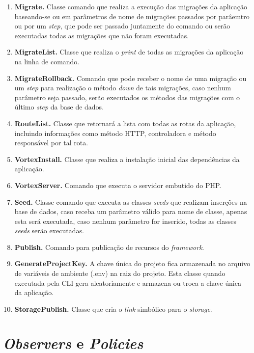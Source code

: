  \begin{enumerate}
     \item \textbf{Migrate.} Classe comando que realiza a execução das migrações da aplicação baseando-se ou em parâmetros de nome de migrações passados por parâemtro ou por um \textit{step}, que pode ser passado juntamente do comando ou serão executadas todas as migrações que não foram executadas.
     \item \textbf{MigrateList.} Classe que realiza o \textit{print} de todas as migrações da aplicação na linha de comando.
     \item \textbf{MigrateRollback.} Comando que pode receber o nome de uma migração ou um \textit{step} para realização o método \textit{down} de tais migrações, caso nenhum parâmetro seja passado, serão executados os métodos das migrações com o último \textit{step} da base de dados.
     \item \textbf{RouteList.} Classe que retornará a lista com todas as rotas da aplicação, incluindo informações como método HTTP, controladora e método responsável por tal rota.
     \item \textbf{VortexInstall.} Classe que realiza a instalação inicial das dependências da aplicação.
     \item \textbf{VortexServer.} Comando que executa o servidor embutido do PHP.
     \item \textbf{Seed.} Classe comando que executa as classes \textit{seeds} que realizam inserções na base de dados, caso receba um parâmetro válido para nome de classe, apenas esta será executada, caso nenhum parâmetro for inserido, todas as classes \textit{seeds} serão executadas.
     \item \textbf{Publish.} Comando para publicação de recursos do \textit{framework}.
     \item \textbf{GenerateProjectKey.} A chave única do projeto fica armazenada no arquivo de variáveis de ambiente (.env) na raiz do projeto. Esta classe quando executada pela CLI gera aleatoriamente e armazena ou troca a chave única da aplicação.
     \item \textbf{StoragePublish.} Classe que cria o \textit{link} simbólico para o \textit{storage}.
 \end{enumerate}

\section{\textit{Observers} e \textit{Policies}}

